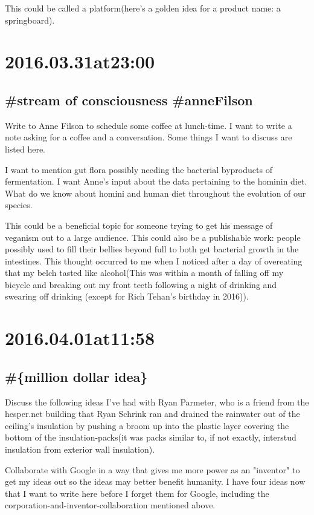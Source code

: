 This could be called a platform(here's a golden idea for a product name: a springboard).

\section*{ 2016.03.31at23:00 }
\subsection*{\#{stream of consciousness} \#anneFilson } 
Write to Anne Filson to schedule some coffee at lunch-time. I want to write a note asking for a coffee and a conversation. Some things I want to discuss are listed here.

I want to mention gut flora possibly needing the bacterial byproducts of fermentation. I want Anne's input about the data pertaining to the hominin diet. What do we know about homini and human diet throughout the evolution of our species.

This could be a beneficial topic for someone trying to get his message of veganism out to a large audience. This could also be a publishable work: people possibly used to fill their bellies beyond full to both get bacterial growth in the intestines. This thought occurred to me when I noticed after a day of overeating that my belch tasted like alcohol(This was within a month of falling off my bicycle and breaking out my front teeth following a night of drinking and swearing off drinking (except for Rich Tehan's birthday in 2016)).

\section*{ 2016.04.01at11:58 }
\subsection*{\#\{million dollar idea\}}
Discuss the following ideas I've had with Ryan Parmeter, who is a friend from the hesper.net building that Ryan Schrink ran and drained the rainwater out of the ceiling's insulation by pushing a broom up into the plastic layer covering the bottom of the insulation-packs(it was packs similar to, if not exactly, interstud insulation from exterior wall insulation).

Collaborate with Google in a way that gives me more power as an "inventor" to get my ideas out so the ideas may better benefit humanity. I have four ideas now that I want to write here before I forget them for Google, including the corporation-and-inventor-collaboration mentioned above.  

